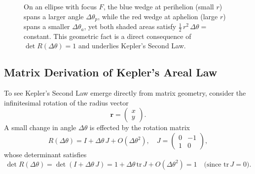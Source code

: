 \begin{figure}[H]
\centering
{}
\caption{On an ellipse with focus \(F\), the blue wedge at perihelion (small \(r\)) spans a larger angle \(\Delta\theta_p\), while the red wedge at aphelion (large \(r\)) spans a smaller \(\Delta\theta_a\), yet both shaded areas satisfy \(\tfrac12\,r^2\,\Delta\theta=\) constant.  This geometric fact is a direct consequence of \(\det R(\Delta\theta)=1\) and underlies Kepler’s Second Law.}
\end{figure}


\subsection{Matrix Derivation of Kepler’s Areal Law}

To see Kepler’s Second Law emerge directly from matrix geometry, consider the infinitesimal rotation of the radius vector
\[
\mathbf{r} = \begin{pmatrix}x\\y\end{pmatrix}.
\]
A small change in angle \(\Delta\theta\) is effected by the rotation matrix
\[
R(\Delta\theta)
= I + \Delta\theta\,J + O(\Delta\theta^2),
\quad
J = \begin{pmatrix}0 & -1\\[4pt]1 & 0\end{pmatrix},
\]
whose determinant satisfies
\[
\det R(\Delta\theta)
= \det(I + \Delta\theta\,J)
= 1 + \Delta\theta\,\mathrm{tr}\,J + O(\Delta\theta^2)
= 1
\quad\text{(since } \mathrm{tr}\,J=0\text{).}
\]

